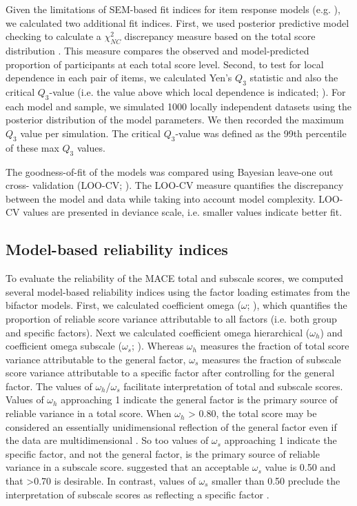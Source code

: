 \documentclass[letterpaper,man,natbib,floatsintext,longtable]{apa6}
\begin{document}
Given the limitations of SEM-based fit indices for item response models (e.g. \citealt{reise2014evaluating}), we calculated two additional fit indices. First, we used posterior predictive model checking to calculate a $\chi^2_{NC}$ discrepancy measure based on the total score distribution \citep{sinharay2006posterior}. This measure compares the observed and model-predicted proportion of participants at each total score level. Second, to test for local dependence in each pair of items, we calculated Yen's $Q_3$ statistic \citep{yen1984effects} and also the critical $Q_3$-value (i.e. the value above which local dependence is indicated; \citealt{christensen2017critical}). For each model and sample, we simulated 1000 locally independent datasets using the posterior distribution of the model parameters. We then recorded the maximum $Q_3$ value per simulation. The critical $Q_3$-value was defined as the 99th percentile of these max $Q_3$ values. 

The goodness-of-fit of the models was compared using Bayesian leave-one out cross- validation (LOO-CV; \citealt{vehtari2017practical}). The LOO-CV measure quantifies the discrepancy between the model and data while taking into account model complexity. LOO-CV values are presented in deviance scale, i.e. smaller values indicate better fit.

\subsection{Model-based reliability indices}

To evaluate the reliability of the MACE total and subscale scores, we computed several model-based reliability indices using the factor loading estimates from the bifactor models. First, we calculated coefficient omega ($\omega$; \citealt{mcdonald1999test}), which quantifies the proportion of reliable score variance attributable to all factors (i.e. both group and specific factors). Next we calculated coefficient omega hierarchical ($\omega_h$) and coefficient omega subscale ($\omega_s$;  \citealt{reise2013scoring}). Whereas $\omega_h$ measures the fraction of total score variance attributable to the general factor, $\omega_s$ measures the fraction of subscale score variance attributable to a specific factor after controlling for the general factor. The values of $\omega_h$/$\omega_s$ facilitate interpretation of total and subscale scores. Values of $\omega_h$ approaching 1 indicate the general factor is the primary source of reliable variance in a total score. When $\omega_h$ > 0.80, the total score may be considered an essentially unidimensional reflection of the general factor even if the data are multidimensional \citep{rodriguez2016applying}. So too values of $\omega_s$ approaching 1 indicate the specific factor, and not the general factor, is the primary source of reliable variance in a subscale score. \cite{canivez2016bifactor} suggested that an acceptable $\omega_s$ value is 0.50 and that >0.70 is desirable. In contrast, values of $\omega_s$ smaller than 0.50 preclude the interpretation of subscale scores as reflecting a specific factor \citep{gignac2013bifactor}. 
\end{document}
